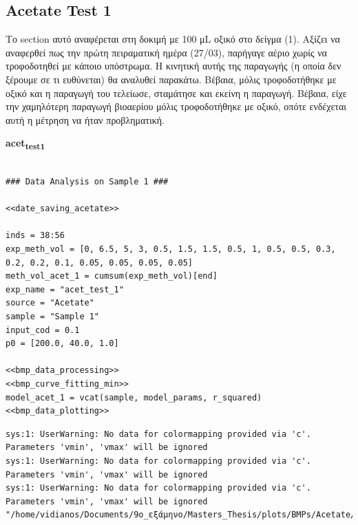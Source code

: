 \documentclass[11pt]{article}
\begin{document}
\subsection{Acetate Test 1}
\label{sec:org8337b42}
Το section αυτό αναφέρεται στη δοκιμή με 100 μL οξικό στο δείγμα (1). Aξίζει να αναφερθεί πως την πρώτη πειραματική ημέρα (27/03), παρήγαγε αέριο χωρίς να τροφοδοτηθεί με κάποιο υπόστρωμα. Η κινητική αυτής της παραγωγής (η οποία δεν ξέρουμε σε τι ευθύνεται) θα αναλυθεί παρακάτω. Βέβαια, μόλις τροφοδοτήθηκε με οξικό και η παραγωγή του τελείωσε, σταμάτησε και εκείνη η παραγωγή. Βέβαια, είχε την χαμηλότερη παραγωγή βιοαερίου μόλις τροφοδοτήθηκε με οξικό, οπότε ενδέχεται αυτή η μέτρηση να ήταν προβληματική.

\textbf{acet\textsubscript{test}\textsubscript{1}}
\begin{verbatim}

### Data Analysis on Sample 1 ###

<<date_saving_acetate>>

inds = 38:56
exp_meth_vol = [0, 6.5, 5, 3, 0.5, 1.5, 1.5, 0.5, 1, 0.5, 0.5, 0.3, 0.2, 0.2, 0.1, 0.05, 0.05, 0.05, 0.05]
meth_vol_acet_1 = cumsum(exp_meth_vol)[end]
exp_name = "acet_test_1"
source = "Acetate"
sample = "Sample 1"
input_cod = 0.1
p0 = [200.0, 40.0, 1.0]

<<bmp_data_processing>>
<<bmp_curve_fitting_min>>
model_acet_1 = vcat(sample, model_params, r_squared)
<<bmp_data_plotting>>
\end{verbatim}

\begin{verbatim}
sys:1: UserWarning: No data for colormapping provided via 'c'. Parameters 'vmin', 'vmax' will be ignored
sys:1: UserWarning: No data for colormapping provided via 'c'. Parameters 'vmin', 'vmax' will be ignored
sys:1: UserWarning: No data for colormapping provided via 'c'. Parameters 'vmin', 'vmax' will be ignored
"/home/vidianos/Documents/9o_εξάμηνο/Masters_Thesis/plots/BMPs/Acetate/methane_kinetics_acet_test_1.png"
\end{verbatim}
\end{document}
